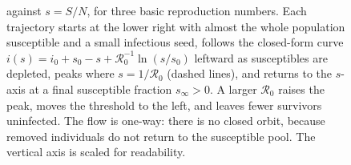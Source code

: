 \begin{figure}[htbp]
{against $s = S/N$, for three basic reproduction numbers. Each
trajectory starts at the lower right with almost the whole population
susceptible and a small infectious seed, follows the closed-form curve
$i(s) = i_{0} + s_{0} - s + \mathcal{R}_{0}^{-1}\ln(s/s_{0})$ leftward
as susceptibles are depleted, peaks where $s = 1/\mathcal{R}_{0}$
(dashed lines), and returns to the $s$-axis at a final susceptible
fraction $s_{\infty} > 0$. A larger $\mathcal{R}_{0}$ raises the peak,
moves the threshold to the left, and leaves fewer survivors uninfected.
The flow is one-way: there is no closed orbit, because removed
individuals do not return to the susceptible pool. The vertical axis is
scaled for readability.}
\label{fig:vol02:ch07:sir-phase}
\end{figure}
